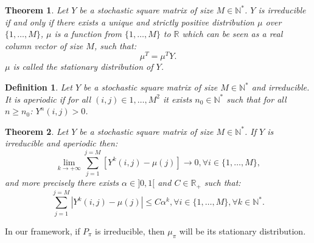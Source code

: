 \documentclass{article} %
\newtheorem{definition}{Definition}
\newtheorem{theorem}{Theorem}
\newcommand{\0}{\mathbf{0}}
\newcommand{\1}{\mathbf{1}}
\begin{document}
\begin{theorem}
 Let $Y$  be a stochastic square matrix of size $M\in\mathbb{N}^*$. $Y$ is irreducible if and only if there exists a unique and strictly positive distribution $\mu$ over $\{1,\dots,M\}$, $\mu$ is a function from $\{1,\dots,M\}$ to $\mathbb{R}$ which can be seen as a real column vector of size $M$, such that:
\begin{equation}
\label{equation: stationarity}
\mu^T=\mu^TY.
\end{equation}
$\mu$ is called the stationary distribution of $Y$.
\end{theorem}
\begin{definition}
Let $Y$ be a stochastic square matrix of size $M\in\mathbb{N}^*$ and irreducible. It is aperiodic if for all $(i,j)\in {1,\dots,M}^2$ it exists $n_0\in \mathbb{N}^*$ such that for all $n\geq n_0$: $Y^n(i,j)>0$.
\end{definition}
\begin{theorem}
\label{theoreme : mixing exponential}
Let $Y$ be a stochastic square matrix of size $M\in\mathbb{N}^*$. If $Y$ is irreducible and aperiodic then:
\begin{equation}
\lim_{k\rightarrow +\infty}\sum_{j=1}^{j=M}[Y^k(i,j)-\mu(j)]\rightarrow 0,\forall i\in\{1,\dots,M\},
\end{equation}
and more precisely there exists $\alpha\in]0,1[$ and $C\in\mathbb{R}_+$ such that:
\begin{equation}
\sum_{j=1}^{j=M}|Y^k(i,j)-\mu(j)|\leq C\alpha^k,\forall i\in\{1,\dots,M\},\forall k\in\mathbb{N}^*.
\end{equation}
\end{theorem}
In our framework, if $P_\pi$ is irreducible, then $\mu_\pi$ will be its stationary distribution.
\end{document}
